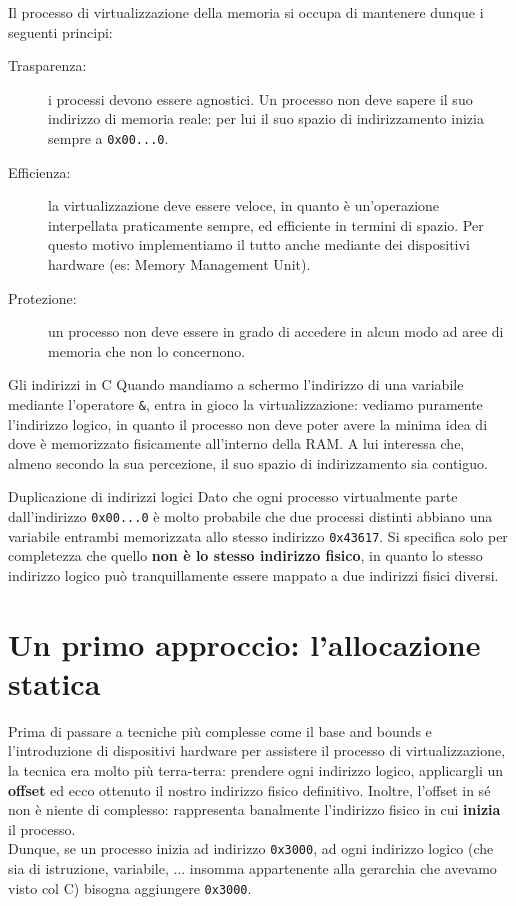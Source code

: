 \documentclass[12pt]{report}
\begin{document}
	Il processo di virtualizzazione della memoria si occupa di mantenere dunque i seguenti principi:
	\begin{description}
		\item [Trasparenza:] i processi devono essere agnostici. Un processo non deve sapere il suo indirizzo di memoria reale: per lui il suo spazio di indirizzamento inizia sempre a \texttt{0x00...0}.
		
		\item[Efficienza:] la virtualizzazione deve essere veloce, in quanto è un'operazione interpellata praticamente sempre, ed efficiente in termini di spazio. Per questo motivo implementiamo il tutto anche mediante dei dispositivi hardware (es: Memory Management Unit).
		
		\item[Protezione:] un processo non deve essere in grado di accedere in alcun modo ad aree di memoria che non lo concernono.
	\end{description}
	
	\begin{osservazione}{Gli indirizzi in C}{}
		Quando mandiamo a schermo l'indirizzo di una variabile mediante l'operatore \texttt{\&}, entra in gioco la virtualizzazione: vediamo puramente l'indirizzo logico, in quanto il processo non deve poter avere la minima idea di dove è memorizzato fisicamente all'interno della RAM. A lui interessa che, almeno secondo la sua percezione, il suo spazio di indirizzamento sia contiguo.
	\end{osservazione}
	
	\begin{osservazione}{Duplicazione di indirizzi logici}{}
		Dato che ogni processo virtualmente parte dall'indirizzo \texttt{0x00...0} è molto probabile che due processi distinti abbiano una variabile entrambi memorizzata allo stesso indirizzo \texttt{0x43617}. Si specifica solo per completezza che quello \textbf{non è lo stesso indirizzo fisico}, in quanto lo stesso indirizzo logico può tranquillamente essere mappato a due indirizzi fisici diversi.
	\end{osservazione}
	
	\section{Un primo approccio: l'allocazione statica}
	Prima di passare a tecniche più complesse come il base and bounds e l'introduzione di dispositivi hardware per assistere il processo di virtualizzazione, la tecnica era molto più terra-terra: prendere ogni indirizzo logico, applicargli un \textbf{offset} ed ecco ottenuto il nostro indirizzo fisico definitivo. Inoltre, l'offset in sé non è niente di complesso: rappresenta banalmente l'indirizzo fisico in cui \textbf{inizia} il processo.\\
	Dunque, se un processo inizia ad indirizzo \texttt{0x3000}, ad ogni indirizzo logico (che sia di istruzione, variabile, ... insomma appartenente alla gerarchia che avevamo visto col C) bisogna aggiungere \texttt{0x3000}.
	\smallbreak
	
\end{document}
